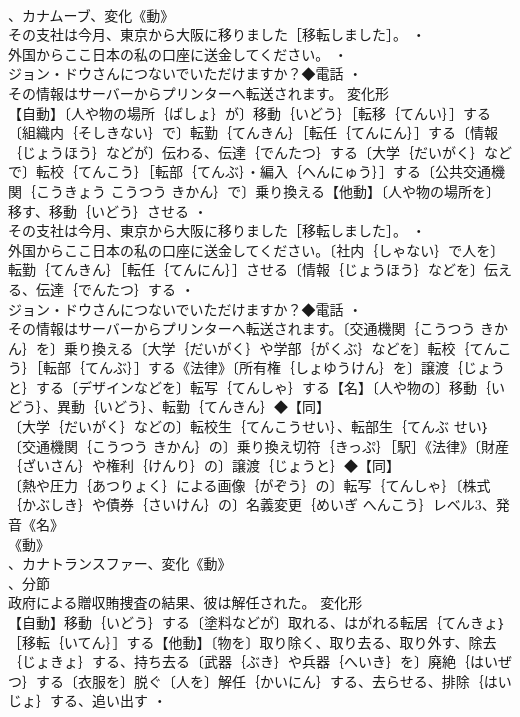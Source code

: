 \documentclass[8pt]{extreport}
\begin{document}
\begin{CJK}{UTF8}{min}
\\	、カナムーブ、変化《動》
\\	その支社は今月、東京から大阪に移りました［移転しました］。 ・
\\	外国からここ日本の私の口座に送金してください。 ・
\\	ジョン・ドウさんにつないでいただけますか？◆電話 ・
\\	その情報はサーバーからプリンターへ転送されます。	変化形 
\\	【自動】〔人や物の場所｛ばしょ｝が〕移動｛いどう｝［転移｛てんい｝］する〔組織内｛そしきない｝で〕転勤｛てんきん｝［転任｛てんにん｝］する〔情報｛じょうほう｝などが〕伝わる、伝達｛でんたつ｝する〔大学｛だいがく｝などで〕転校｛てんこう｝［転部｛てんぶ｝・編入｛へんにゅう｝］する〔公共交通機関｛こうきょう こうつう きかん｝で〕乗り換える【他動】〔人や物の場所を〕移す、移動｛いどう｝させる ・
\\	その支社は今月、東京から大阪に移りました［移転しました］。 ・
\\	外国からここ日本の私の口座に送金してください。〔社内｛しゃない｝で人を〕転勤｛てんきん｝［転任｛てんにん｝］させる〔情報｛じょうほう｝などを〕伝える、伝達｛でんたつ｝する ・
\\	ジョン・ドウさんにつないでいただけますか？◆電話 ・
\\	その情報はサーバーからプリンターへ転送されます。〔交通機関｛こうつう きかん｝を〕乗り換える〔大学｛だいがく｝や学部｛がくぶ｝などを〕転校｛てんこう｝［転部｛てんぶ｝］する《法律》〔所有権｛しょゆうけん｝を〕譲渡｛じょうと｝する〔デザインなどを〕転写｛てんしゃ｝する【名】〔人や物の〕移動｛いどう｝、異動｛いどう｝、転勤｛てんきん｝◆【同】
\\	〔大学｛だいがく｝などの〕転校生｛てんこうせい｝、転部生｛てんぶ せい｝〔交通機関｛こうつう きかん｝の〕乗り換え切符｛きっぷ｝［駅］《法律》〔財産｛ざいさん｝や権利｛けんり｝の〕譲渡｛じょうと｝◆【同】
\\	〔熱や圧力｛あつりょく｝による画像｛がぞう｝の〕転写｛てんしゃ｝〔株式｛かぶしき｝や債券｛さいけん｝の〕名義変更｛めいぎ へんこう｝レベル3、発音《名》
\\	《動》
\\	、カナトランスファー、変化《動》
\\	、分節
\\	政府による贈収賄捜査の結果、彼は解任された。	変化形 
\\	【自動】移動｛いどう｝する〔塗料などが〕取れる、はがれる転居｛てんきょ｝［移転｛いてん｝］する【他動】〔物を〕取り除く、取り去る、取り外す、除去｛じょきょ｝する、持ち去る〔武器｛ぶき｝や兵器｛へいき｝を〕廃絶｛はいぜつ｝する〔衣服を〕脱ぐ〔人を〕解任｛かいにん｝する、去らせる、排除｛はいじょ｝する、追い出す ・

\end{CJK}
\end{document}
